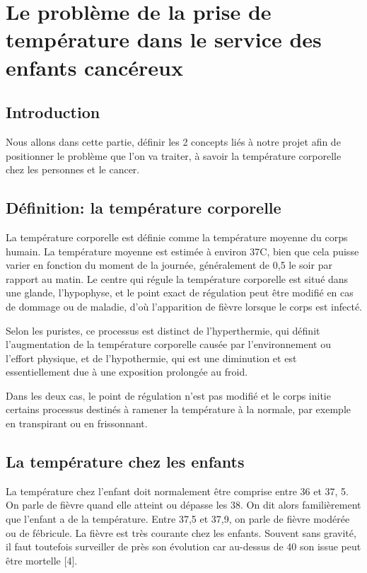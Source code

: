 \documentclass[12pt]{article}
\begin{document}
\newpage
\section{Le problème de la prise de température dans le service des enfants cancéreux}

\subsection{Introduction}
Nous allons dans cette partie, définir les 2 concepts liés à notre projet afin de positionner le problème que l’on va traiter, à savoir la température corporelle chez les personnes et le cancer.

\subsection{Définition: la température corporelle}
La température corporelle est définie comme la température moyenne du corps humain. La température moyenne est estimée à environ 37\textdegree{}C, bien que cela puisse varier en fonction du moment de la journée, généralement de 0,5 le soir par rapport au matin. Le centre qui régule la température corporelle est situé dans une glande, l'hypophyse, et le point exact de régulation peut être modifié en cas de dommage ou de maladie, d'où l'apparition de fièvre lorsque le corps est infecté. 

Selon les puristes, ce processus est distinct de l'hyperthermie, qui définit l'augmentation de la température corporelle causée par l'environnement ou l'effort physique, et de l'hypothermie, qui est une diminution et est essentiellement due à une exposition prolongée au froid. 

Dans les deux cas, le point de régulation n'est pas modifié et le corps initie certains processus destinés à ramener la température à la normale, par exemple en transpirant ou en frissonnant.

\subsection{La température chez les enfants}
La température chez l’enfant doit normalement être comprise entre 36 et 37, 5. On parle de fièvre quand elle atteint ou dépasse les 38. On dit alors familièrement que l’enfant a de la température. Entre 37,5 et 37,9, on parle de fièvre modérée ou de fébricule. La fièvre est très courante chez les enfants. Souvent sans gravité, il faut toutefois surveiller de près son évolution car au-dessus de 40 son issue peut être mortelle [4].
\end{document}
